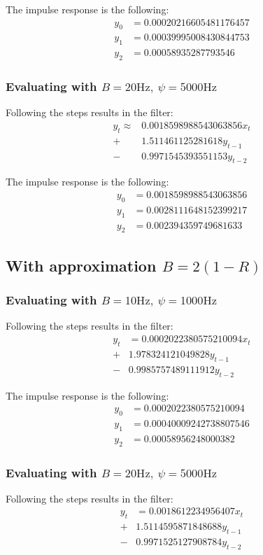 \documentclass{article}
\begin{document}
The impulse response is the following:
\begin{align*}
	y_0 & = 0.00020216605481176457 \\
	y_1 & = 0.00039995008430844753 \\
	y_2 & = 0.00058935287793546
\end{align*}

\subsubsection{Evaluating with $B = 20 \si{\hertz},\ \psi = 5000 \si{\hertz}$}
Following the steps results in the filter:
\begin{align*}
	y_t \approx & 0.0018598988543063856x_t  \\
	+           & 1.511461125281618y_{t-1}  \\
	-           & 0.9971545393551153y_{t-2}
\end{align*}


The impulse response is the following:
\begin{align*}
	y_0 & = 0.0018598988543063856 \\
	y_1 & = 0.0028111648152399217 \\
	y_2 & = 0.002394359749681633
\end{align*}

\subsection{With approximation $B = 2(1 - R)$}
\subsubsection{Evaluating with $B = 10 \si{\hertz},\ \psi = 1000 \si{\hertz}$}
Following the steps results in the filter:
\begin{align*}
	y_t & = 0.0002022380575210094x_t \\
	+   & 1.978324121049828y_{t-1}   \\
	-   & 0.9985757489111912y_{t-2}
\end{align*}

The impulse response is the following:
\begin{align*}
	y_0 & = 0.0002022380575210094  \\
	y_1 & = 0.00040009242738807546 \\
	y_2 & = 0.00058956248000382
\end{align*}

\subsubsection{Evaluating with $B = 20 \si{\hertz},\ \psi = 5000 \si{\hertz}$}
Following the steps results in the filter:
\begin{align*}
	y_t & = 0.0018612234956407x_t   \\
	+   & 1.5114595871848688y_{t-1} \\
	-   & 0.9971525127908784y_{t-2}
\end{align*}
\end{document}
